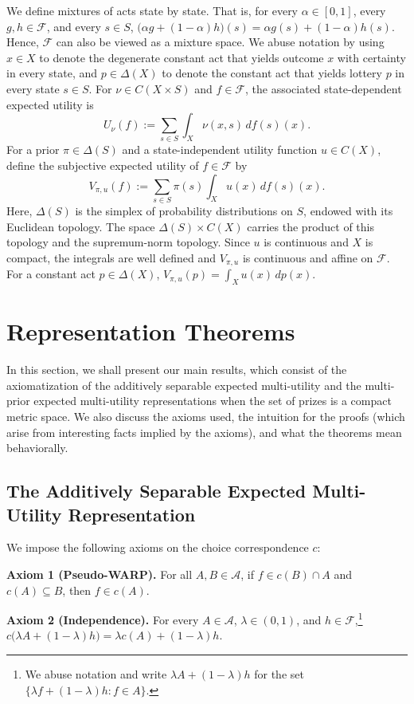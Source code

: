 \documentclass[11pt]{article}
\begin{document}
We define mixtures of acts state by state. That is, for every $\alpha\in[0,1]$, every $g,h\in\mathcal{F}$, and every $s\in S$, $\bigl(\alpha g+(1-\alpha)h\bigr)(s)=\alpha g(s)+(1-\alpha)h(s)$. Hence, $\mathcal{F}$ can also be viewed as a mixture space. We abuse notation by using $x\in X$ to denote the degenerate constant act that yields outcome $x$ with certainty in every state, and $p\in\Delta(X)$ to denote the constant act that yields lottery $p$ in every state $s\in S$. For $\nu\in C(X\times S)$ and $f\in\mathcal{F}$, the associated state-dependent expected utility is
\[
    U_\nu(f):=\sum_{s\in S}\int_X \nu(x,s)\,df(s)(x).
\]
For a prior $\pi\in\Delta(S)$ and a state-independent utility function $u\in C(X)$, define the subjective expected utility of $f\in\mathcal{F}$ by
\[
    V_{\pi,u}(f):=\sum_{s\in S}\pi(s)\int_X u(x)\,df(s)(x).
\]
Here, $\Delta(S)$ is the simplex of probability distributions on $S$, endowed with its Euclidean topology. The space $\Delta(S)\times C(X)$ carries the product of this topology and the supremum-norm topology. Since $u$ is continuous and $X$ is compact, the integrals are well defined and $V_{\pi,u}$ is continuous and affine on $\mathcal{F}$. For a constant act $p\in\Delta(X)$, $V_{\pi,u}(p)=\int_X u(x)\,dp(x)$.

\section{Representation Theorems}

In this section, we shall present our main results, which consist of the
axiomatization of the additively separable expected multi-utility and the
multi-prior expected multi-utility representations when the set of prizes
is a compact metric space. We also discuss the axioms used, the intuition
for the proofs (which arise from interesting facts implied by the axioms),
and what the theorems mean behaviorally.

\subsection{The Additively Separable Expected Multi-Utility Representation}

We impose the following axioms on the choice correspondence $c$:

\medskip
\noindent\textbf{Axiom 1 (Pseudo-WARP).} For all $A,B\in\mathcal{A}$, if $f\in c(B)\cap A$ and $c(A)\subseteq B$, then $f\in c(A)$.

\medskip
\noindent\textbf{Axiom 2 (Independence).} For every $A\in\mathcal{A}$, $\lambda\in(0,1)$, and $h\in\mathcal{F}$,\footnote{We abuse notation and write $\lambda A+(1-\lambda)h$ for the set $\{\lambda f+(1-\lambda)h:f\in A\}$.} $c\bigl(\lambda A+(1-\lambda)h\bigr)=\lambda c(A)+(1-\lambda)h$.
\end{document}
